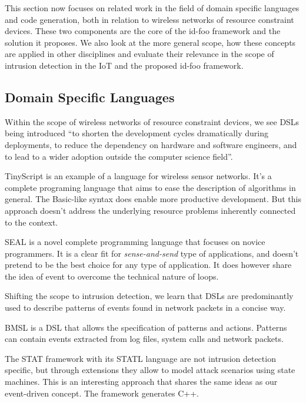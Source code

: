 \documentclass[conference]{IEEEtran}
\newcommand{\NAME}{id-foo\xspace}
\begin{document}
This section now focuses on related work in the field of domain specific
languages and code generation, both in relation to wireless networks of
resource constraint devices. These two components are the core of the \NAME
framework and the solution it proposes. We also look at the more general scope,
how these concepts are applied in other disciplines and evaluate their
relevance in the scope of intrusion detection in the IoT and the proposed \NAME
framework.

\subsection{Domain Specific Languages}

Within the scope of wireless networks of resource constraint devices, we see
DSLs being introduced \enquote{to shorten the development cycles dramatically
during deployments, to reduce the dependency on hardware and software
engineers, and to lead to a wider adoption outside the computer science
field}\cite{sadilek2008domain,naumowicz2009prototyping}.

TinyScript\cite{levis2004tinyscript} is an example of a language for wireless
sensor networks. It's a complete programing language that aims to ease the
description of algorithms in general. The Basic-like syntax does enable more
productive development. But this approach doesn't address the underlying
resource problems inherently connected to the context.

SEAL\cite{elsts2013seal} is a novel complete programming language that focuses
on novice programmers. It is a clear fit for \emph{sense-and-send} type of
applications, and doesn't pretend to be the best choice for any type of
application. It does however share the idea of event to overcome the technical
nature of loops.

Shifting the scope to intrusion detection, we learn that DSLs are predominantly
used to describe patterns of events found in network
packets\cite{sekar1999high,roesch1999snort} in a concise way.

BMSL\cite{uppuluri2001experiences} is a DSL that allows the specification of
patterns and actions. Patterns can contain events extracted from log files,
system calls and network packets.

The STAT framework with its STATL
language\cite{eckmann2002statl,vigna2003designing} are not intrusion detection
specific, but through extensions they allow to model attack scenarios using
state machines. This is an interesting approach that shares the same ideas as
our event-driven concept. The framework generates C++.
\end{document}
